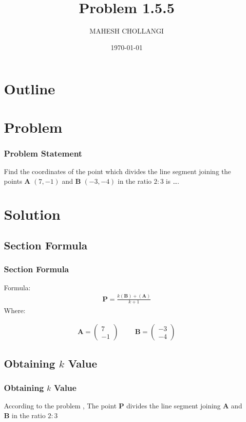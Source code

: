 \documentclass{beamer}
\title{Problem 1.5.5}
\author{MAHESH CHOLLANGI}
\date{\today}
\providecommand{\brak}[1]{\ensuremath{\left(#1\right)}}
\theoremstyle{remark}
\newcommand{\myvec}[1]{\ensuremath{\begin{pmatrix}#1\end{pmatrix}}}
\let\vec\mathbf
\numberwithin{equation}{section}
\begin{document}
\begin{frame}
\titlepage
\end{frame}

\section*{Outline}
\begin{frame}
\tableofcontents
\end{frame}
\section{Problem}
\begin{frame}
\frametitle{Problem Statement}
%
 Find the coordinates of the point which divides the line segment joining the points $\vec{A}$ $\brak{7,-1}$ and $\vec{B}$ $\brak{-3, -4}$ in the ratio $2 : 3$ is \dots.
\end{frame}

\section{Solution}
\subsection{Section Formula}
\begin{frame}
\frametitle{Section Formula}
Formula:
\begin{align}
\vec{P}=\frac{k(\vec{B})+(\vec{A})}{k+1}
\end{align}
Where: 


\begin{align}
\vec{A}=\myvec{7\\-1} \hspace{1cm} \vec{B}=\myvec{-3\\-4} 
\end{align}

\end{frame}
\subsection{Obtaining $k$ Value}
\begin{frame}
\frametitle{Obtaining $k$ Value}
According to the problem , 
The point $\vec{P}$ divides the line segment joining $\vec{A}$ and $\vec{B}$ in the ratio $2:3$

\end{frame}
\end{document}
